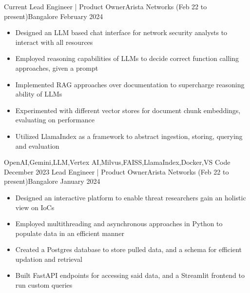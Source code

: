 %
%
%

\begin{experiences}
  \experience
    {Current}       {Lead Engineer | Product Owner}{Arista Networks (Feb 22 to present)}{Bangalore}
    {February 2024} {
                      \begin{itemize}
                        \item Designed an LLM based chat interface for network security analysts to interact with all resources
                        \item Employed reasoning capabilities of LLMs to decide correct function calling approaches, given a prompt
                        \item Implemented RAG approaches over documentation to supercharge reasoning ability of LLMs
                        \item Experimented with different vector stores for document chunk embeddings, evaluating on performance
                        \item Utilized LlamaIndex as a framework to abstract ingestion, storing, querying and evaluation
                      \end{itemize}
                    }
                    {OpenAI,Gemini,LLM,Vertex AI,Milvus,FAISS,LlamaIndex,Docker,VS Code}
  \emptySeparator
  \experience
    {December 2023} {Lead Engineer | Product Owner}{Arista Networks (Feb 22 to present)}{Bangalore}
    {January 2024}  {
                      \begin{itemize}
                        \item Designed an interactive platform to enable threat researchers gain an holistic view on IoCs
                        \item Employed multithreading and asynchronous approaches in Python to populate data in an efficient manner
                        \item Created a Postgres database to store pulled data, and a schema for efficient updation and retrieval
                        \item Built FastAPI endpoints for accessing said data, and a Streamlit frontend to run custom queries
                      \end{itemize}
}
\end{experiences}
